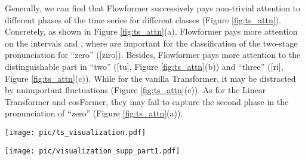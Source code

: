 \documentclass[nohyperref]{article}
\theoremstyle{plain}
\theoremstyle{definition}
\theoremstyle{remark}
\begin{document}
Generally, we can find that Flowformer successively pays non-trivial attention to different phases of the time series for different classes (Figure \ref{fig:ts_attn}). Concretely, as shown in Figure \ref{fig:ts_attn}(a), Flowformer pays more attention on the intervals  and , where are important for the classification of the two-stage pronunciation for ``zero'' ([\textprimstress ziro]). Besides, Flowformer pays more attention to the distinguishable part in ``two'' ([tu\textipa{:}], Figure \ref{fig:ts_attn}(b)) and ``three'' ([ri\textipa{:}], Figure \ref{fig:ts_attn}(c)). While for the vanilla Transformer, it may be distracted by unimportant fluctuations (Figure \ref{fig:ts_attn}(c)). As for the Linear Transformer and cosFormer, they may fail to capture the second phase in the pronunciation of ``zero'' (Figure \ref{fig:ts_attn}(a)).

\begin{figure*}[h]
\begin{center}
	\centerline{\texttt{[image: pic/ts\_visualization.pdf]}}
	\caption{Learned attention in the SpokenArabicDigits dataset. We plot the competition weights  for Flowformer.}
	\label{fig:ts_attn}
\end{center}
\vspace{-10pt}
\end{figure*}

\begin{figure*}[h]
\begin{center}
	\centerline{\texttt{[image: pic/visualization\_supp\_part1.pdf]}}
	\caption{Comparison of learned attention in the ImageNet-1K dataset. }
	\label{fig:supp_attention}
\end{center}
\vspace{-10pt}
\end{figure*}
\end{document}
